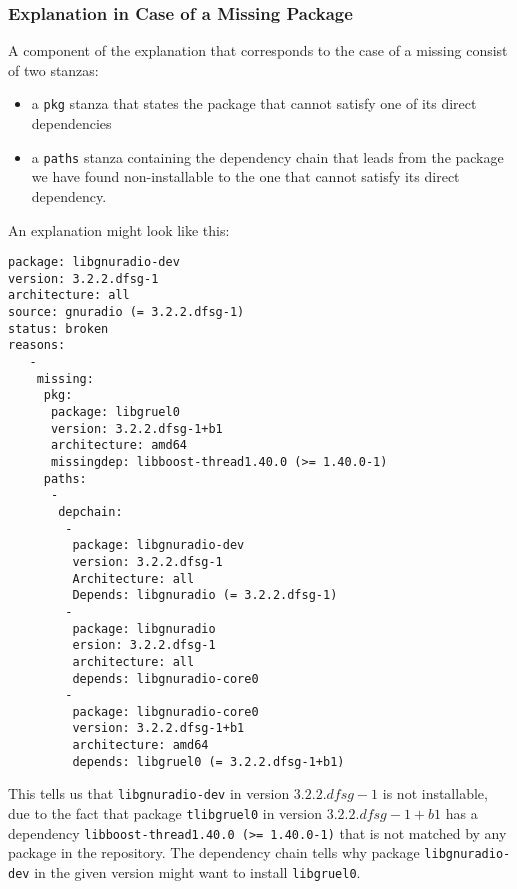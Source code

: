 \subsubsection{Explanation in Case of a Missing Package}
A component of the explanation that corresponds to the case of a
missing consist of two stanzas:
\begin{itemize}
\item a \texttt{pkg} stanza that states the package that cannot satisfy
  one of its direct dependencies
\item a \texttt{paths} stanza containing the dependency chain that
  leads from the package we have found non-installable to the one that
  cannot satisfy its direct dependency.
\end{itemize}
\begin{example}
An explanation might look like this:
\begin{verbatim}
package: libgnuradio-dev
version: 3.2.2.dfsg-1
architecture: all
source: gnuradio (= 3.2.2.dfsg-1)
status: broken
reasons:
   -
    missing:
     pkg:
      package: libgruel0
      version: 3.2.2.dfsg-1+b1
      architecture: amd64
      missingdep: libboost-thread1.40.0 (>= 1.40.0-1)
     paths:
      -
       depchain:
        -
         package: libgnuradio-dev
         version: 3.2.2.dfsg-1
         Architecture: all
         Depends: libgnuradio (= 3.2.2.dfsg-1)
        -
         package: libgnuradio
         ersion: 3.2.2.dfsg-1
         architecture: all
         depends: libgnuradio-core0
        -
         package: libgnuradio-core0
         version: 3.2.2.dfsg-1+b1
         architecture: amd64
         depends: libgruel0 (= 3.2.2.dfsg-1+b1)
\end{verbatim}
This tells us that \texttt{libgnuradio-dev} in version $3.2.2.dfsg-1$
is not installable, due to the fact that package \texttt{tlibgruel0}
in version $3.2.2.dfsg-1+b1$ has a dependency
\texttt{libboost-thread1.40.0 (>= 1.40.0-1)} that is not matched by
any package in the repository. The dependency chain tells why package
\texttt{libgnuradio-dev} in the given version might want to install
\texttt{libgruel0}.
\end{example}

